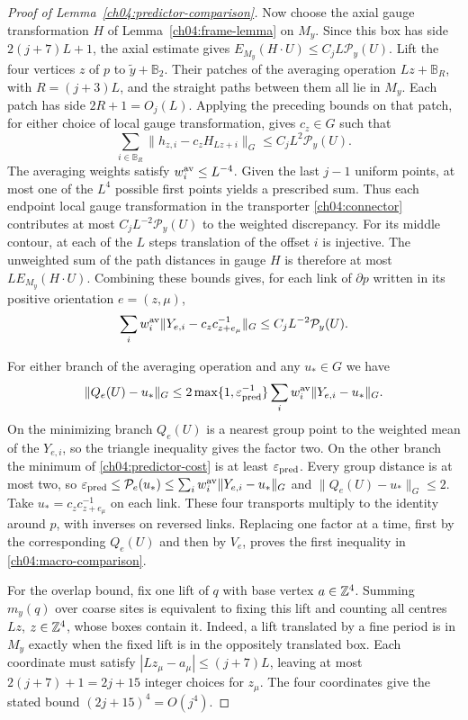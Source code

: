 \begin{proof}[Proof of Lemma~\ref{ch04:predictor-comparison}]
Now choose the axial gauge transformation $H$ of Lemma~\ref{ch04:frame-lemma} on $M_y$.
Since this box has side $2(j+7)L+1$, the axial estimate gives
$E_{M_y}(H\cdot U)\le C_j L\mathcal P_y(U)$. Lift the four vertices
$z$ of $p$ to $\tilde y+\mathbb B_2$. Their patches of the averaging operation
$Lz+\mathbb B_R$, with $R=(j+3)L$, and the straight paths between them
all lie in $M_y$. Each patch has side $2R+1=O_j(L)$. Applying the
preceding bounds on that patch, for either choice of local gauge transformation, gives $c_z\in G$
such that
\begin{equation}
 \sum_{i\in\mathbb B_R}\|h_{z,i}-c_zH_{Lz+i}\|_G
                                  \le C_j L^2\mathcal P_y(U).
 \label{ch04:patch-frame-sum}
\end{equation}
The averaging weights satisfy $w_i^{\rm av}\le L^{-4}$. Given the
last $j-1$ uniform points, at most one of the $L^4$ possible first
points yields a prescribed sum. Thus each endpoint local gauge transformation in the
transporter \eqref{ch04:connector} contributes at most
$C_jL^{-2}\mathcal P_y(U)$ to the weighted discrepancy. For its middle
contour, at each of the $L$ steps translation of the offset $i$ is injective.
The unweighted sum of the path distances in gauge $H$ is therefore at
most $L E_{M_y}(H\cdot U)$. Combining these bounds gives, for each link
of $\partial p$ written in its positive orientation $e=(z,\mu)$,
\[
 \sum_i w_i^{\rm av}\|Y_{e,i}-c_zc_{z+e_\mu}^{-1}\|_G
                                      \le C_jL^{-2}\mathcal P_y(U).
\]

For either branch of the averaging operation and any $u_*\in G$ we have
\[
 \|Q_e(U)-u_*\|_G\le2\max\{1,\varepsilon_{\rm pred}^{-1}\}
                      \sum_i w_i^{\rm av}\|Y_{e,i}-u_*\|_G .
\]
On the minimizing branch $Q_e(U)$ is a nearest group point to the
weighted mean of the $Y_{e,i}$, so the triangle inequality gives the
factor two. On the other branch the minimum of
\eqref{ch04:predictor-cost} is at least $\varepsilon_{\rm pred}$.
Every group distance is at most two, so
$\varepsilon_{\rm pred}\le\mathcal P_e(u_*)\le
\sum_i w_i^{\rm av}\|Y_{e,i}-u_*\|_G$ and $\|Q_e(U)-u_*\|_G\le2$.
Take $u_*=c_zc_{z+e_\mu}^{-1}$ on each link.
These four transports multiply to the identity around $p$, with
inverses on reversed links. Replacing one factor at a time, first by
the corresponding $Q_e(U)$ and then by $V_e$, proves the first
inequality in \eqref{ch04:macro-comparison}.

For the overlap bound, fix one lift of $q$ with base vertex $a\in\mathbb Z^4$.
Summing $m_y(q)$ over coarse sites is equivalent to fixing this lift
and counting all centres $Lz$, $z\in\mathbb Z^4$, whose boxes contain it.
Indeed, a lift translated by a fine period is in $M_y$ exactly when the
fixed lift is in the oppositely translated box. Each coordinate must
satisfy $|Lz_\mu-a_\mu|\le(j+7)L$, leaving at most $2(j+7)+1=2j+15$
integer choices for $z_\mu$. The four coordinates give the stated
bound $(2j+15)^4=O(j^4)$.
\end{proof}

